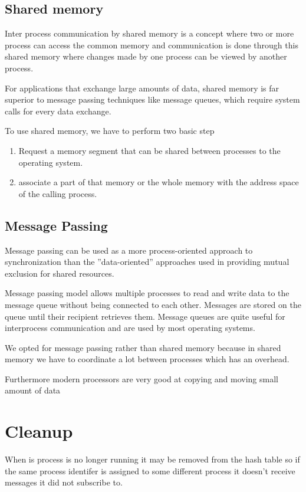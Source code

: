 \documentclass[12pt]{report}
\begin{document}
    \subsection{Shared memory}
    Inter process communication by shared memory is a concept where two or
    more process can access the common memory and communication is done
    through this shared memory where changes made by one process can be
    viewed by another process.

    For applications that exchange large amounts of data, shared memory is
    far superior to message passing techniques like message queues, which require
    system calls for every data exchange.

    To use shared memory, we have to perform two basic step
    \begin{enumerate}
		\item Request a memory segment that can be shared between processes to the operating system.		
        \item associate a part of that memory or the whole memory with the address space of the calling process.
	\end{enumerate}
    
    \subsection{Message Passing}
    Message passing can be used as a more process-oriented approach to synchronization 
    than the ”data-oriented” approaches used in providing mutual
    exclusion for shared resources.

    Message passing model allows multiple processes to read and write data
    to the message queue without being connected to each other. Messages are
    stored on the queue until their recipient retrieves them. Message queues are
    quite useful for interprocess communication and are used by most operating
    systems.

    We opted for message passing rather than shared memory because in
    shared memory we have to coordinate a lot between processes which has an
    overhead.

    Furthermore modern processors are very good at copying and moving
    small amount of data

	\section{Cleanup}
	When is process is no longer running it may be removed from the hash table
	so if the same process identifer is assigned to some different process it 
	doesn't receive messages it did not subscribe to.
    
\end{document}
